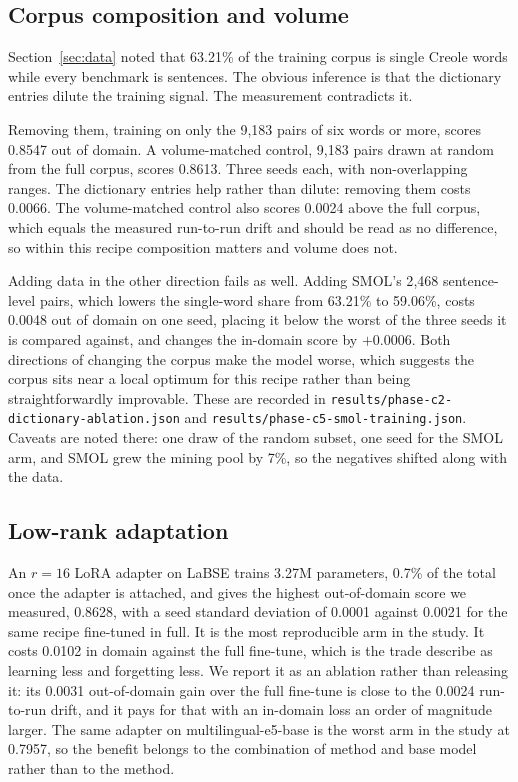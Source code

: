 \documentclass[11pt]{article}
\begin{document}
\subsection{Corpus composition and volume}
\label{sec:composition}

Section~\ref{sec:data} noted that 63.21\% of the training corpus is single Creole words while every
benchmark is sentences. The obvious inference is that the dictionary entries dilute the training
signal. The measurement contradicts it.

Removing them, training on only the 9{,}183 pairs of six words or more, scores 0.8547 out of domain.
A volume-matched control, 9{,}183 pairs drawn at random from the full corpus, scores 0.8613. Three
seeds each, with non-overlapping ranges. The dictionary entries help rather than dilute: removing
them costs 0.0066. The volume-matched control also scores 0.0024 above the full corpus, which equals
the measured run-to-run drift and should be read as no difference, so within this recipe composition
matters and volume does not.

Adding data in the other direction fails as well. Adding SMOL's 2{,}468 sentence-level pairs, which
lowers the single-word share from 63.21\% to 59.06\%, costs 0.0048 out of domain on one seed, placing
it below the worst of the three seeds it is compared against, and changes the in-domain score by
$+0.0006$. Both directions of changing the corpus make the model worse, which suggests the corpus
sits near a local optimum for this recipe rather than being straightforwardly improvable. These are
recorded in \texttt{results/phase-c2-dictionary-ablation.json} and
\texttt{results/phase-c5-smol-training.json}. Caveats are noted there: one draw of the random subset,
one seed for the SMOL arm, and SMOL grew the mining pool by 7\%, so the negatives shifted along with
the data.

\subsection{Low-rank adaptation}
\label{sec:lora}

An $r{=}16$ LoRA adapter on LaBSE trains 3.27M parameters, 0.7\% of the total once the adapter is
attached, and gives the highest out-of-domain score we measured, 0.8628, with a seed standard
deviation of 0.0001 against 0.0021 for the same recipe fine-tuned in full. It is the most reproducible arm in the study. It costs 0.0102 in domain
against the full fine-tune, which is the trade \citet{biderman2024lora} describe as learning less and
forgetting less. We report it as an ablation rather than releasing it: its 0.0031 out-of-domain gain
over the full fine-tune is close to the 0.0024 run-to-run drift, and it pays for that with an
in-domain loss an order of magnitude larger. The same adapter on multilingual-e5-base is the worst
arm in the study at 0.7957, so the benefit belongs to the combination of method and base model rather
than to the method.
\end{document}
